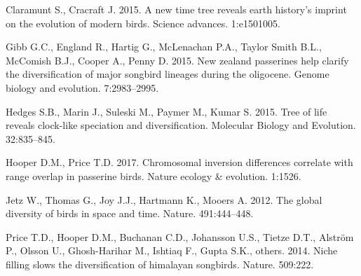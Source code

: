 \documentclass[]{article}
\begin{document}
\leavevmode\hypertarget{ref-claramunt2015new}{}%
Claramunt S., Cracraft J. 2015. A new time tree reveals earth history's imprint on the evolution of modern birds. Science advances. 1:e1501005.

\leavevmode\hypertarget{ref-gibb2015new}{}%
Gibb G.C., England R., Hartig G., McLenachan P.A., Taylor Smith B.L., McComish B.J., Cooper A., Penny D. 2015. New zealand passerines help clarify the diversification of major songbird lineages during the oligocene. Genome biology and evolution. 7:2983--2995.

\leavevmode\hypertarget{ref-Hedges2015}{}%
Hedges S.B., Marin J., Suleski M., Paymer M., Kumar S. 2015. Tree of life reveals clock-like speciation and diversification. Molecular Biology and Evolution. 32:835--845.

\leavevmode\hypertarget{ref-hooper2017chromosomal}{}%
Hooper D.M., Price T.D. 2017. Chromosomal inversion differences correlate with range overlap in passerine birds. Nature ecology \& evolution. 1:1526.

\leavevmode\hypertarget{ref-Jetz2012}{}%
Jetz W., Thomas G., Joy J.J., Hartmann K., Mooers A. 2012. The global diversity of birds in space and time. Nature. 491:444--448.

\leavevmode\hypertarget{ref-price2014niche}{}%
Price T.D., Hooper D.M., Buchanan C.D., Johansson U.S., Tietze D.T., Alström P., Olsson U., Ghosh-Harihar M., Ishtiaq F., Gupta S.K., others. 2014. Niche filling slows the diversification of himalayan songbirds. Nature. 509:222.
\end{document}
